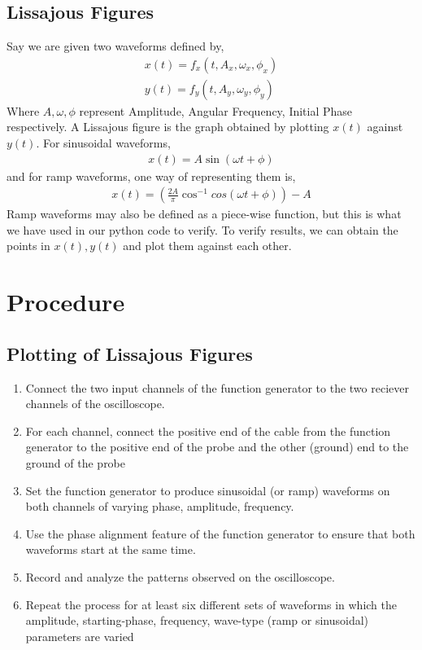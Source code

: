 \documentclass[a4paper,12pt]{article}
\begin{document}
\subsection*{Lissajous Figures}
Say we are given two waveforms defined by,
\begin{align*}
  x(t) = f_x(t, A_x, \omega _x, \phi _x)\\
  y(t) = f_y(t, A_y, \omega _y, \phi_y)
\end{align*}
Where $A, \omega, \phi$ represent Amplitude, Angular Frequency, Initial Phase respectively. A Lissajous figure is the graph obtained by plotting $x(t)$ against $y(t)$. \newline
For sinusoidal waveforms, 
\begin{align*}
  x(t) = A \sin (\omega t + \phi)
\end{align*}
and for ramp waveforms, one way of representing them is, 
\begin{align*}
  x(t) = (\frac{2A}{\pi} \cos^{-1}cos(\omega t + \phi)) - A
  \end{align*}
  Ramp waveforms may also be defined as a piece-wise function, but this is what we have used in our python code to verify. To verify results, we can obtain the points in $x(t), y(t)$ and plot them against each other.
\section*{Procedure}

\subsection*{Plotting of Lissajous Figures}
\begin{enumerate}
	\item Connect the two input channels of the function generator to the two reciever channels of the oscilloscope.
	\item For each channel, connect the positive end of the cable from the function generator to the positive end of the probe and the other (ground) end to the ground of the probe
	\item Set the function generator to produce sinusoidal (or ramp) waveforms on both channels of varying phase, amplitude, frequency.
	\item Use the phase alignment feature of the function generator to ensure that both waveforms start at the same time.
	\item Record and analyze the patterns observed on the oscilloscope.
	\item Repeat the process for at least six different sets of waveforms in which the amplitude, starting-phase, frequency, wave-type (ramp or sinusoidal) parameters are varied
\end{enumerate}
\end{document}
